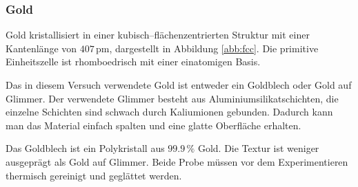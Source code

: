 \documentclass[12pt,a4paper]{scrartcl}
\numberwithin{equation}{section} %
\begin{document}
\hypertarget{goldstruktur}{%
\subsubsection{Gold}\label{goldstruktur}}
Gold kristallisiert in einer kubisch--flächenzentrierten Struktur mit einer Kantenlänge von $407\mathrm{\,pm}$, dargestellt in Abbildung \ref{abb:fcc}. Die primitive Einheitszelle ist rhomboedrisch mit einer einatomigen Basis.

Das in diesem Versuch verwendete Gold ist entweder ein Goldblech oder Gold auf Glimmer. Der verwendete Glimmer besteht aus Aluminiumsilikatschichten, die einzelne Schichten sind schwach durch Kaliumionen gebunden. Dadurch kann man das Material einfach spalten und eine glatte Oberfläche erhalten.

Das Goldblech ist ein Polykristall aus $99.9\,\%$ Gold. Die Textur ist weniger ausgeprägt als Gold auf Glimmer. Beide Probe müssen vor dem Experimentieren thermisch gereinigt und geglättet werden.
\end{document}
